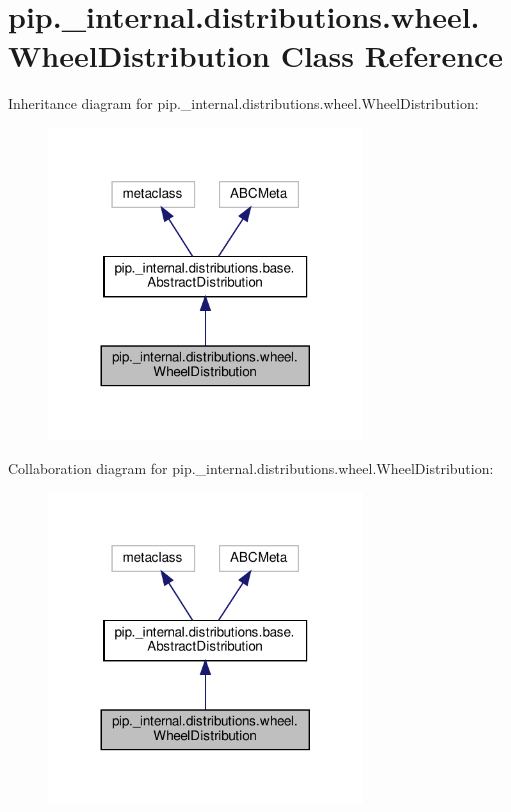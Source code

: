 \hypertarget{classpip_1_1__internal_1_1distributions_1_1wheel_1_1WheelDistribution}{}\section{pip.\+\_\+internal.\+distributions.\+wheel.\+Wheel\+Distribution Class Reference}
\label{classpip_1_1__internal_1_1distributions_1_1wheel_1_1WheelDistribution}


Inheritance diagram for pip.\+\_\+internal.\+distributions.\+wheel.\+Wheel\+Distribution\+:
\nopagebreak
\begin{figure}[H]
\begin{center}
\leavevmode
\includegraphics[width=236pt]{classpip_1_1__internal_1_1distributions_1_1wheel_1_1WheelDistribution__inherit__graph}
\end{center}
\end{figure}


Collaboration diagram for pip.\+\_\+internal.\+distributions.\+wheel.\+Wheel\+Distribution\+:
\nopagebreak
\begin{figure}[H]
\begin{center}
\leavevmode
\includegraphics[width=236pt]{classpip_1_1__internal_1_1distributions_1_1wheel_1_1WheelDistribution__coll__graph}
\end{center}
\end{figure}
